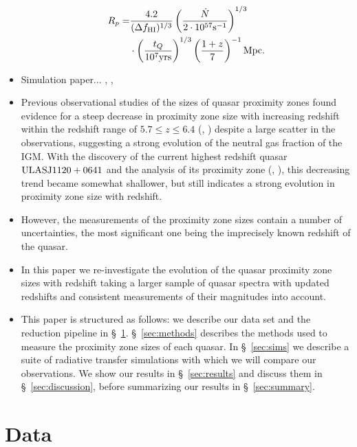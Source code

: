\documentclass[iop]{emulateapj}
\begin{document}
\begin{itemize}
\begin{align}
R_p = &\frac{4.2}{(\Delta f_{\rm HI})^{1/3}}\left(\frac{\dot{N}}{2\cdot 10^{57}\rm s^{-1}}\right)^{1/3}\nonumber\\
&\cdot \left(\frac{t_Q}{10^{7}\rm yrs}\right)^{1/3} \left(\frac{1+z}{7}\right)^{-1} \rm Mpc. 
\end{align}
\item Simulation paper... \citet{BoltonHaehnelt2007}, \citet{BoltonHaehnelt2006}, \citet{Keating2015}
\item Previous observational studies of the sizes of quasar proximity zones found evidence for a steep decrease in proximity zone size with increasing redshift within the redshift range of $5.7\leq z\leq 6.4$ (\citet{Fan2006}, \citet{Carilli2010}) despite a large scatter in the observations, suggesting a strong evolution of the neutral gas fraction of the IGM. With the discovery of the current highest redshift quasar $\rm ULAS J1120+0641$\citep{Mortlock2011} and the analysis of its proximity zone (\citet{Venemans2015}, \citet{Bosman2015}), this decreasing trend became somewhat shallower, but still indicates a strong evolution in proximity zone size with redshift.  
\item However, the measurements of the proximity zone sizes contain a number of uncertainties, the most significant one being the imprecisely known redshift of the quasar. 
\item In this paper we re-investigate the evolution of the quasar proximity zone sizes with redshift taking a larger sample of quasar spectra with updated redshifts and consistent measurements of their magnitudes into account. 
\item This paper is structured as follows: we describe our data set and the reduction pipeline in \S~\ref{sec:data}. \S~\ref{sec:methods} describes the methods used to measure the proximity zone sizes of each quasar. In \S~\ref{sec:sims} we describe a suite of radiative transfer simulations with which we will compare our observations. We show our results in \S~\ref{sec:results} and discuss them in \S~\ref{sec:discussion}, before summarizing our results in \S~\ref{sec:summary}. 
\end{itemize}


\section{Data}\label{sec:data}
\end{document}
